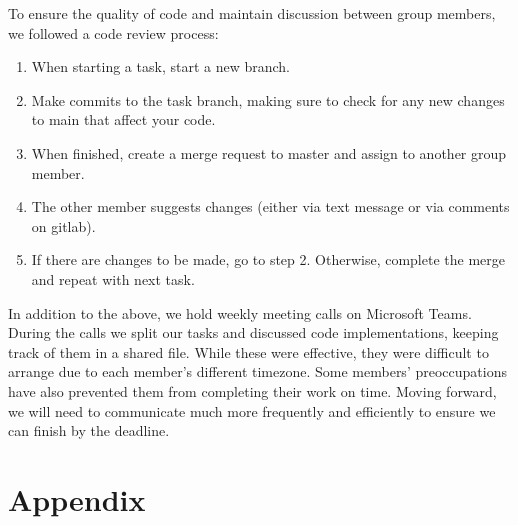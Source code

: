 \documentclass[11pt]{article}
\begin{document}
To ensure the quality of code and maintain discussion between group members,
we followed a code review process:
\begin{enumerate}
    \item When starting a task, start a new branch.
    \item Make commits to the task branch, making sure to check for any new
    changes to main that affect your code.
    \item When finished, create a merge request to master and assign to
    another group member.
    \item The other member suggests changes (either via text message or
    via comments on gitlab).
    \item If there are changes to be made, go to step 2. Otherwise, complete
    the merge and repeat with next task.
\end{enumerate}
In addition to the above, we hold weekly meeting calls on Microsoft Teams.
During the calls we split our tasks and discussed code implementations,
keeping track of them in a shared file. While these were effective, they were
difficult to arrange due to each member's different timezone. Some members'
preoccupations have also prevented them from completing their work on time.
Moving forward, we will need to communicate much more frequently and
efficiently to ensure we can finish by the deadline.
\newpage
\section{Appendix}
\end{document}
